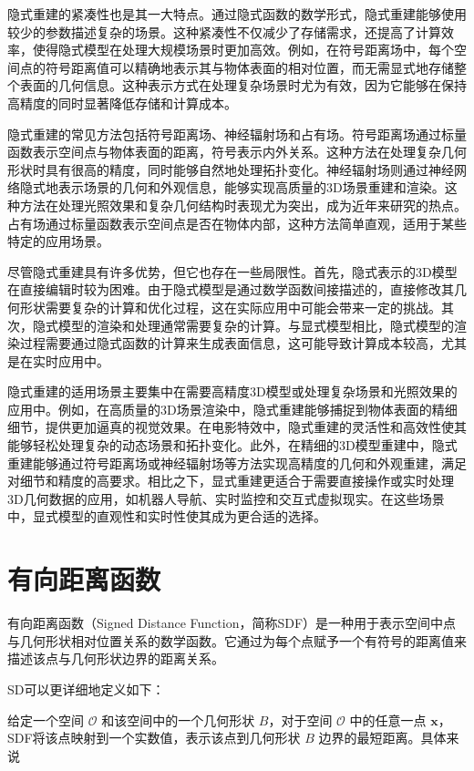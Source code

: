 \documentclass{xduugthesis}
\begin{document}
隐式重建的紧凑性也是其一大特点。通过隐式函数的数学形式，隐式重建能够使用较少的参数描述复杂的场景。这种紧凑性不仅减少了存储需求，还提高了计算效率，使得隐式模型在处理大规模场景时更加高效。例如，在符号距离场中，每个空间点的符号距离值可以精确地表示其与物体表面的相对位置，而无需显式地存储整个表面的几何信息。这种表示方式在处理复杂场景时尤为有效，因为它能够在保持高精度的同时显著降低存储和计算成本。

隐式重建的常见方法包括符号距离场、神经辐射场和占有场。符号距离场通过标量函数表示空间点与物体表面的距离，符号表示内外关系。这种方法在处理复杂几何形状时具有很高的精度，同时能够自然地处理拓扑变化。神经辐射场则通过神经网络隐式地表示场景的几何和外观信息，能够实现高质量的3D场景重建和渲染。这种方法在处理光照效果和复杂几何结构时表现尤为突出，成为近年来研究的热点。占有场通过标量函数表示空间点是否在物体内部，这种方法简单直观，适用于某些特定的应用场景。

尽管隐式重建具有许多优势，但它也存在一些局限性。首先，隐式表示的3D模型在直接编辑时较为困难。由于隐式模型是通过数学函数间接描述的，直接修改其几何形状需要复杂的计算和优化过程，这在实际应用中可能会带来一定的挑战。其次，隐式模型的渲染和处理通常需要复杂的计算。与显式模型相比，隐式模型的渲染过程需要通过隐式函数的计算来生成表面信息，这可能导致计算成本较高，尤其是在实时应用中。

隐式重建的适用场景主要集中在需要高精度3D模型或处理复杂场景和光照效果的应用中。例如，在高质量的3D场景渲染中，隐式重建能够捕捉到物体表面的精细细节，提供更加逼真的视觉效果。在电影特效中，隐式重建的灵活性和高效性使其能够轻松处理复杂的动态场景和拓扑变化。此外，在精细的3D模型重建中，隐式重建能够通过符号距离场或神经辐射场等方法实现高精度的几何和外观重建，满足对细节和精度的高要求。相比之下，显式重建更适合于需要直接操作或实时处理3D几何数据的应用，如机器人导航、实时监控和交互式虚拟现实。在这些场景中，显式模型的直观性和实时性使其成为更合适的选择。
\section{有向距离函数}
有向距离函数（Signed Distance Function，简称SDF）是一种用于表示空间中点与几何形状相对位置关系的数学函数。它通过为每个点赋予一个有符号的距离值来描述该点与几何形状边界的距离关系。

SD可以更详细地定义如下：

给定一个空间 \( \mathcal{O} \) 和该空间中的一个几何形状 \( B \)，对于空间 \( \mathcal{O} \) 中的任意一点 \( \mathbf{x} \)，SDF将该点映射到一个实数值，表示该点到几何形状 \( B \) 边界的最短距离。具体来说
\end{document}
